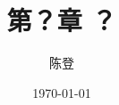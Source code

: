 \documentclass[UTF8]{ctexart}
\title{第？章 ？}
\author{陈登}
\date{\today}
\begin{document}
\section{}

\subsection{}

\subsection{}

\subsection{}

\subsection{}


\end{document}

